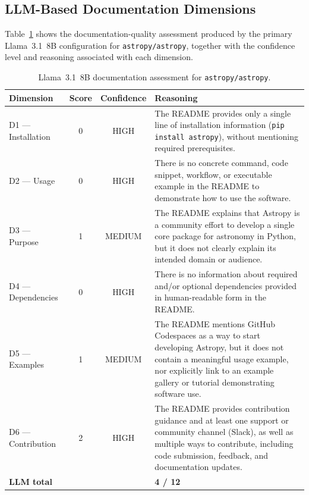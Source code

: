 \subsection{LLM-Based Documentation Dimensions}
Table~\ref{tab:example_llm} shows the documentation-quality assessment
produced by the primary Llama~3.1~8B configuration for
\texttt{astropy/astropy}, together with the confidence level and
reasoning associated with each dimension.
\begin{table}[h]
\centering
\caption{Llama~3.1~8B documentation assessment for
\texttt{astropy/astropy}.}
\label{tab:example_llm}
\small
\begin{tabular}{lccp{8cm}}
\hline
\textbf{Dimension} & \textbf{Score} & \textbf{Confidence} & \textbf{Reasoning} \\
\hline

D1 --- Installation
  & 0
  & HIGH
  & The README provides only a single line of installation
    information (\texttt{pip install astropy}), without mentioning
    required prerequisites. \\

D2 --- Usage
  & 0
  & HIGH
  & There is no concrete command, code snippet, workflow, or
    executable example in the README to demonstrate how to use the
    software. \\

D3 --- Purpose
  & 1
  & MEDIUM
  & The README explains that Astropy is a community effort to
    develop a single core package for astronomy in Python, but it
    does not clearly explain its intended domain or audience. \\

D4 --- Dependencies
  & 0
  & HIGH
  & There is no information about required and/or optional
    dependencies provided in human-readable form in the README. \\

D5 --- Examples
  & 1
  & MEDIUM
  & The README mentions GitHub Codespaces as a way to start
    developing Astropy, but it does not contain a meaningful usage
    example, nor explicitly link to an example gallery or tutorial
    demonstrating software use. \\

D6 --- Contribution
  & 2
  & HIGH
  & The README provides contribution guidance and at least one
    support or community channel (Slack), as well as multiple ways
    to contribute, including code submission, feedback, and
    documentation updates. \\
\hline
\multicolumn{3}{l}{\textbf{LLM total}} & \textbf{4 / 12} \\
\hline
\end{tabular}
\end{table}

